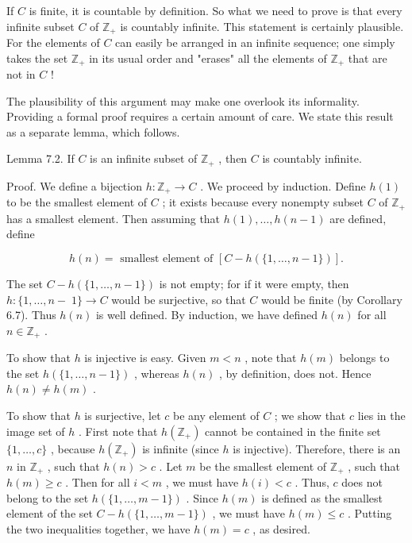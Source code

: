 \documentclass[10pt]{article}
\begin{document}
If \(C\) is finite, it is countable by definition. So what we need to prove is that every infinite subset \(C\) of \({\mathbb{Z}}_{ + }\) is countably infinite. This statement is certainly plausible. For the elements of \(C\) can easily be arranged in an infinite sequence; one simply takes the set \({\mathbb{Z}}_{ + }\) in its usual order and "erases" all the elements of \({\mathbb{Z}}_{ + }\) that are not in \(C\) !

The plausibility of this argument may make one overlook its informality. Providing a formal proof requires a certain amount of care. We state this result as a separate lemma, which follows.

Lemma 7.2. If \(C\) is an infinite subset of \({\mathbb{Z}}_{ + }\) , then \(C\) is countably infinite.

Proof. We define a bijection \(h : {\mathbb{Z}}_{ + } \rightarrow  C\) . We proceed by induction. Define \(h\left( 1\right)\) to be the smallest element of \(C\) ; it exists because every nonempty subset \(C\) of \({\mathbb{Z}}_{ + }\) has a smallest element. Then assuming that \(h\left( 1\right) ,\ldots ,h\left( {n - 1}\right)\) are defined, define

\[
h\left( n\right)  = \text{ smallest element of }\left\lbrack  {C - h\left( {\{ 1,\ldots ,n - 1\} }\right) }\right\rbrack  .
\]

The set \(C - h\left( {\{ 1,\ldots ,n - 1\} }\right)\) is not empty; for if it were empty, then \(h : \{ 1,\ldots ,n - \; 1\}  \rightarrow  C\) would be surjective, so that \(C\) would be finite (by Corollary 6.7). Thus \(h\left( n\right)\) is well defined. By induction, we have defined \(h\left( n\right)\) for all \(n \in  {\mathbb{Z}}_{ + }\) .

To show that \(h\) is injective is easy. Given \(m < n\) , note that \(h\left( m\right)\) belongs to the set \(h\left( {\{ 1,\ldots ,n - 1\} }\right)\) , whereas \(h\left( n\right)\) , by definition, does not. Hence \(h\left( n\right)  \neq  h\left( m\right)\) .

To show that \(h\) is surjective, let \(c\) be any element of \(C\) ; we show that \(c\) lies in the image set of \(h\) . First note that \(h\left( {\mathbb{Z}}_{ + }\right)\) cannot be contained in the finite set \(\{ 1,\ldots ,c\}\) , because \(h\left( {\mathbb{Z}}_{ + }\right)\) is infinite (since \(h\) is injective). Therefore, there is an \(n\) in \({\mathbb{Z}}_{ + }\) , such that \(h\left( n\right)  > c\) . Let \(m\) be the smallest element of \({\mathbb{Z}}_{ + }\) , such that \(h\left( m\right)  \geq  c\) . Then for all \(i < m\) , we must have \(h\left( i\right)  < c\) . Thus, \(c\) does not belong to the set \(h\left( {\{ 1,\ldots ,m - 1\} }\right)\) . Since \(h\left( m\right)\) is defined as the smallest element of the set \(C - h\left( {\{ 1,\ldots ,m - 1\} }\right)\) , we must have \(h\left( m\right)  \leq  c\) . Putting the two inequalities together, we have \(h\left( m\right)  = c\) , as desired.
\end{document}
